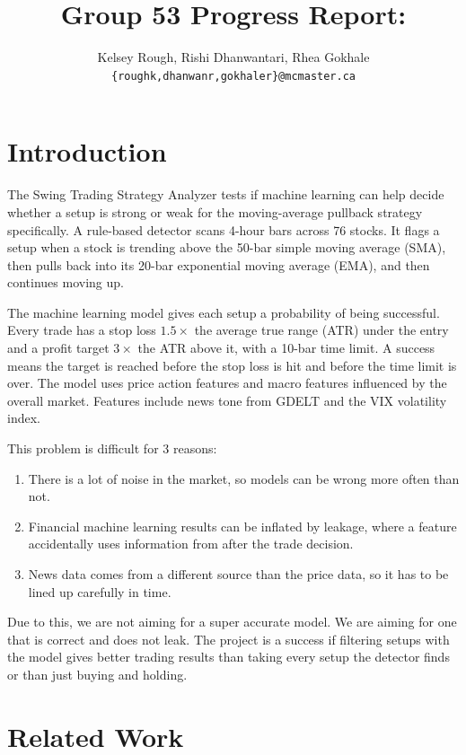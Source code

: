 \documentclass[11pt]{article}
\title{Group 53 Progress Report:}
\author{Kelsey Rough, Rishi Dhanwantari, Rhea Gokhale \\
  \texttt{\{roughk,dhanwanr,gokhaler\}@mcmaster.ca} }
\begin{document}
\maketitle

\section{Introduction}

The Swing Trading Strategy Analyzer tests if machine learning can help decide whether a setup is strong or weak for the moving-average pullback strategy specifically. A rule-based detector scans 4-hour bars across 76 stocks. It flags a setup when a stock is trending above the 50-bar simple moving average (SMA), then pulls back into its 20-bar exponential moving average (EMA), and then continues moving up.

The machine learning model gives each setup a probability of being successful. Every trade has a stop loss $1.5\times$ the average true range (ATR) under the entry and a profit target $3\times$ the ATR above it, with a 10-bar time limit. A success means the target is reached before the stop loss is hit and before the time limit is over. The model uses price action features and macro features influenced by the overall market. Features include news tone from GDELT and the VIX volatility index.

This problem is difficult for 3 reasons:
\begin{enumerate}
  \item There is a lot of noise in the market, so models can be wrong more often than not.
  \item Financial machine learning results can be inflated by leakage, where a feature accidentally uses information from after the trade decision.
  \item News data comes from a different source than the price data, so it has to be lined up carefully in time.
\end{enumerate}

Due to this, we are not aiming for a super accurate model. We are aiming for one that is correct and does not leak. The project is a success if filtering setups with the model gives better trading results than taking every setup the detector finds or than just buying and holding.
\section{Related Work}
\end{document}
